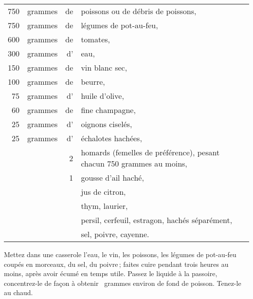 \footnotesize
\begin{longtable}{rrrp{16em}}
  750 & grammes    & de & poissons ou de débris de poissons,                                              \\
  750 & grammes    & de & légumes de pot-au-feu,                                                          \\
  600 & grammes    & de & tomates,                                                                        \\
  300 & grammes    & d' & eau,                                                                            \\
  150 & grammes    & de & vin blanc sec,                                                                  \\
  100 & grammes    & de & beurre,                                                                         \\
   75 & grammes    & d' & huile d'olive,                                                                  \\
   60 & grammes    & de & fine champagne,                                                                 \\
   25 & grammes    & d' & oignons ciselés,                                                                \\
   25 & grammes    & d' & échalotes hachées,                                                              \\
      &            &  2 & homards (femelles de préférence), pesant chacun 750 grammes au moins,           \\
      &            &  1 & gousse d'ail haché,                                                             \\
      &            &    & jus de citron,                                                                  \\
      &            &    & thym, laurier,                                                                  \\
      &            &    & persil, cerfeuil, estragon, hachés séparément,                                  \\
      &            &    & sel, poivre, cayenne.                                                           \\
\end{longtable}
\normalsize

Mettez dans une casserole l'eau, le vin, les poissons, les légumes de pot-au-feu
coupés en morceaux, du sel, du poivre ; faites cuire pendant trois heures au moins,
après avoir écumé en temps utile. Passez le liquide à la passoire, concentrez-le
de façon à obtenir {\mmm} grammes environ de fond de poisson. Tenez-le au chaud.

